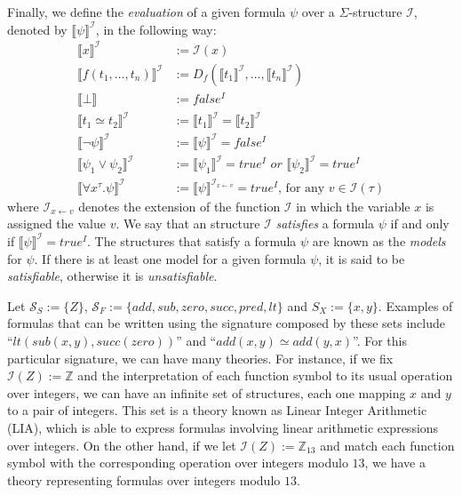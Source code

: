 Finally, we define the \textit{evaluation} of a given formula $\psi$ over a $\Sigma$-structure $\mathcal{I}$, denoted by $\llbracket \psi \rrbracket^{\mathcal{I}}$, in the following way:
\begin{align*}
  \llbracket x \rrbracket^{\mathcal{I}} &:= \mathcal{I}(x) \\
  \llbracket f(t_{1}, \ldots, t_{n}) \rrbracket^{\mathcal{I}} &:= D_{f}(\llbracket t_{1} \rrbracket^{\mathcal{I}}, \ldots, \llbracket t_{n} \rrbracket^{\mathcal{I}}) \\
  \llbracket \bot \rrbracket &:= false^{I} \\
  \llbracket t_{1} \simeq t_{2} \rrbracket^{\mathcal{I}} &:= \llbracket t_{1} \rrbracket^{\mathcal{I}} = \llbracket t_{2} \rrbracket^{\mathcal{I}} \\
  \llbracket \neg \psi \rrbracket^{\mathcal{I}} &:= \llbracket \psi \rrbracket^{\mathcal{I}} = false^{I} \\
  \llbracket \psi_{1} \vee \psi_{2} \rrbracket^{\mathcal{I}} &:= \llbracket \psi_{1} \rrbracket^{\mathcal{I}} = true^{I}\,\, or\,\, \llbracket \psi_{2} \rrbracket^{\mathcal{I}} = true^{I} \\
  \llbracket \forall x^{\tau} . \psi \rrbracket^{\mathcal{I}} &:= \llbracket \psi \rrbracket^{\mathcal{I}_{x \gets v}} = true^{I} \text{, for any } v \in \mathcal{I}(\tau)
\end{align*}
where $\mathcal{I}_{x \gets v}$ denotes the extension of the function $\mathcal{I}$ in which the variable $x$ is assigned the value $v$. We say that an structure $\mathcal{I}$ \textit{satisfies} a formula $\psi$ if and only if $\llbracket \psi \rrbracket^{\mathcal{I}} = true^{I}$. The structures that satisfy a formula $\psi$ are known as the \textit{models} for $\psi$. If there is at least
one model for a given formula $\psi$, it is said to be \textit{satisfiable}, otherwise it is \textit{unsatisfiable}.

\begin{example}[LIA]\label{ex:lia}
  Let $\mathcal{S}_{S} := \{Z\}$, $\mathcal{S}_{F} := \{add, sub, zero, succ, pred, lt\}$ and
  $S_{X} := \{x, y\}$. Examples of formulas that can be written using the signature composed by these sets include ``$lt(sub(x, y), succ(zero))$'' and ``$add(x, y) \simeq add(y, x)$''. For this particular signature, we can have many theories. For instance, if we fix $\mathcal{I}(Z) := \mathbb{Z}$ and the interpretation of each function symbol to its usual operation over integers, we can have an infinite set of structures, each one mapping $x$ and $y$ to a pair of integers. This set is a theory known as Linear Integer Arithmetic (LIA), which is able to express formulas involving
  linear arithmetic expressions over integers.
  On the other hand, if we let $\mathcal{I}(Z) := \mathbb{Z}_{13}$ and match each function symbol with the corresponding operation over integers modulo $13$, we have a theory representing formulas over integers modulo $13$.
\end{example}

